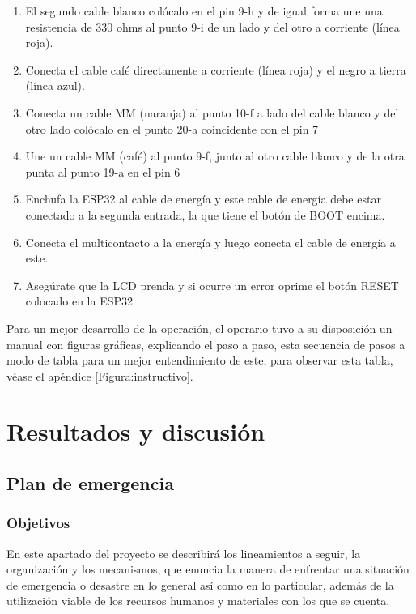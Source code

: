 \begin{enumerate}
        \item El segundo cable blanco colócalo en el pin 9-h y de igual forma une una resistencia de 330 ohms al punto 9-i de un lado y del otro a corriente (línea roja).
    
        \item Conecta el cable café directamente a corriente (línea roja) y el negro a tierra (línea azul). 
    
        \item  Conecta un cable MM (naranja) al punto 10-f a lado del cable blanco y del otro lado colócalo en el punto 20-a coincidente con el pin 7
    
        \item Une un cable MM (café) al punto 9-f, junto al otro cable blanco y de la otra punta al punto 19-a en el pin 6 
    
        \item  Enchufa la ESP32 al cable de energía y este cable de energía debe estar conectado a la segunda entrada, la que tiene el botón de BOOT encima.
    
        \item Conecta el multicontacto a la energía y luego conecta el cable de energía a este.
    
    
        \item Asegúrate que la LCD prenda y si ocurre un error oprime el botón RESET colocado en la ESP32
    
    \end{enumerate}
    
    
    Para un mejor desarrollo de la operación, el operario tuvo a su disposición un manual con figuras gráficas, explicando el paso a paso, esta secuencia de pasos a modo de tabla para un mejor entendimiento de este, para observar esta tabla, véase el apéndice \ref{Figura:instructivo}.
    
    
    
    
    
    
    
    \section{Resultados y discusión}
    \subsection{Plan de emergencia}
    
    
    \subsubsection{Objetivos}
    En este apartado del proyecto se describirá los lineamientos a seguir, la organización y los mecanismos, que enuncia la manera de enfrentar una situación de emergencia o desastre en lo general
    así como en lo particular, además de la utilización viable de los recursos humanos y materiales con los que se cuenta.
    
